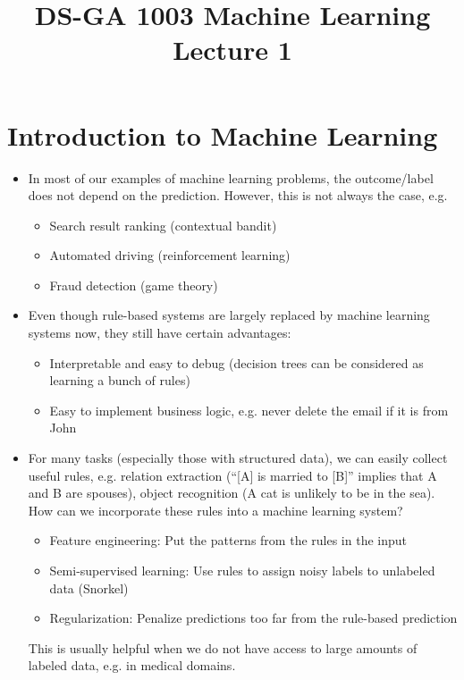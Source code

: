 \documentclass[11pt]{article}
\begin{document}
\title{DS-GA 1003 Machine Learning \\ Lecture 1}
\maketitle
\section{Introduction to Machine Learning}
\begin{itemize}
\item In most of our examples of machine learning problems, the outcome/label does not depend on the prediction. However, this is not always the case, e.g.
\begin{itemize}
\item Search result ranking (contextual bandit)
\item Automated driving (reinforcement learning)
\item Fraud detection (game theory)
\end{itemize}

\item Even though rule-based systems are largely replaced by machine learning systems now, they still have certain advantages:
\begin{itemize}
\item Interpretable and easy to debug (decision trees can be considered as learning a bunch of rules)
\item Easy to implement business logic, e.g. never delete the email if it is from John
\end{itemize}

\item For many tasks (especially those with structured data), we can easily collect useful rules, e.g.
relation extraction (``[A] is married to [B]'' implies that A and B are spouses),
object recognition (A cat is unlikely to be in the sea).
How can we incorporate these rules into a machine learning system?
\begin{itemize}
    \item Feature engineering: Put the patterns from the rules in the input
    \item Semi-supervised learning: Use rules to assign noisy labels to unlabeled data (Snorkel)
    \item Regularization: Penalize predictions too far from the rule-based prediction
\end{itemize}
This is usually helpful when we do not have access to large amounts of labeled data, e.g. in medical domains.
\end{itemize}
\end{document}
